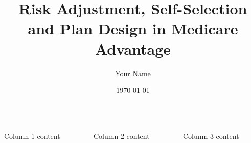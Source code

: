\documentclass{beamer}
\title{Risk Adjustment, Self-Selection and Plan Design in Medicare Advantage}
\author{Your Name}
\institute{Your Institution}
\date{\today}
\begin{document}
\begin{frame}[t]
\begin{columns}[t,totalwidth=\textwidth]
  \begin{column}{0.3\textwidth}
    Column 1 content
  \end{column}
  \begin{column}{0.3\textwidth}
    Column 2 content
  \end{column}
  \begin{column}{0.3\textwidth}
    Column 3 content
  \end{column}
\end{columns}
\end{frame}
\end{document}
